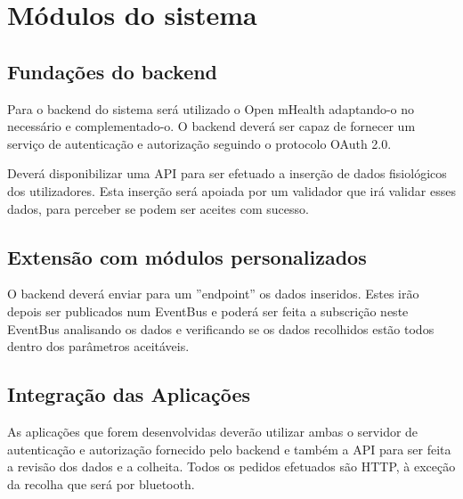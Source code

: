\section{Módulos do sistema}
\subsection{Fundações do backend}
Para o backend do sistema será utilizado o Open mHealth adaptando-o no necessário e complementado-o. O backend deverá ser capaz de fornecer um serviço de autenticação e autorização seguindo o protocolo OAuth 2.0. \par 
Deverá disponibilizar uma \gls{API} para ser efetuado a inserção de dados fisiológicos dos utilizadores. Esta inserção será apoiada por um validador que irá validar esses dados, para perceber se podem ser aceites com sucesso.
\subsection{Extensão com módulos personalizados}
O backend deverá enviar para um ''endpoint'' os dados inseridos. Estes irão depois ser publicados num EventBus e poderá ser feita a subscrição neste EventBus analisando os dados e verificando se os dados recolhidos estão todos dentro dos parâmetros aceitáveis.

\subsection{Integração das Aplicações}
As aplicações que forem desenvolvidas deverão utilizar ambas o servidor de autenticação e autorização fornecido pelo backend e também a API para ser feita a revisão dos dados e a colheita. Todos os pedidos efetuados são \gls{HTTP}, à exceção da recolha que será por bluetooth.

